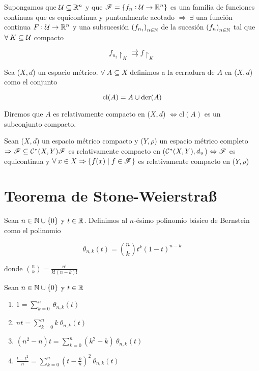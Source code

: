 \begin{corollary}
    Supongamos que $\mathcal{U} \subseteq \mathbb{R}^n$ y que $\mathscr{F} = \{ f_n : \mathcal{U} \to \mathbb{R}^n \}$ es una familia de funciones continuas que es equicontinua y puntualmente acotado $\Rightarrow \: \exists$ una función continua $F : \mathcal{U} \to \mathbb{R}^n$ y una subsucesión ${\left(f_{n_t}\right)}_{n \in \mathbb{N}}$ de la sucesión ${\left(f_n\right)}_{n \in \mathbb{N}}$ tal que $\forall \: K \subseteq \mathcal{U}$ compacto

    $$f_{n_t} \restriction_K \rightrightarrows f \restriction_K$$
\end{corollary}

\begin{definition} [Cerradura]
    Sea ($X,d$) un espacio métrico. $\forall \: A \subseteq X$ definimos a la cerradura de $A$ en ($X,d$) como el conjunto 

    $$\mathrm{cl}(A) = A \cup \mathrm{der}(A)$$
\end{definition}

\begin{definition} 
    Diremos que $A$ es relativamente compacto en ($X,d$) $\iff \mathrm{cl}(A)$ es un subconjunto compacto.
\end{definition}

\begin{theorem} 
    Sean ($X,d$) un espacio métrico compacto y ($Y, \rho$) un espacio métrico completo $\Rightarrow \mathscr{F} \subseteq {\ensuremath{\mathcal{C}}}^{\ast}(X,Y) \mathscr{F}$ es relativamente compacto en (${\mathcal{C}}^{\ast}(X,Y), d_u$) $\Leftrightarrow \mathscr{F}$ es equicontinua y $\forall \: x \in X \Rightarrow \{f(x) \mid f \in \mathscr{F} \}$ es relativamente compacto en ($Y, \rho$) 
\end{theorem}

\section{Teorema de Stone-Weierstraß}

\begin{definition} 
    Sean $n \in \mathbb{N} \cup \{ 0 \}$ y $t \in \mathbb{R}$. Definimos al $n$-ésimo polinomio básico de Bernstein como el polinomio

    $${\theta}_{n,k}(t) = \binom{n}{k} {t}^{k}{(1-t)}^{n-k}$$

    donde $\binom{n}{k} = \frac{n !}{k ! (n-k) !}$
\end{definition}

\begin{theorem} \label{theom529}
    Sean $n \in \mathbb{N} \cup \{ 0 \}$ y $t \in \mathbb{R}$

    \begin{enumerate}
        \item $1 = \sum\limits_{k=0}^{n} \: {\theta}_{n,k} (t)$
        \item $nt = \sum\limits_{k=0}^{n} k \: {\theta}_{n,k} (t)$
        \item $(n^2-n)t = \sum\limits_{k=0}^{n} (k^2-k)\: {\theta}_{n,k} (t)$
        \item $\frac{t-t^2}{n} = \sum\limits_{k=0}^{n} {\left( t - \frac{k}{n} \right)}^{2}\: {\theta}_{n,k} (t)$
    \end{enumerate}
\end{theorem}

